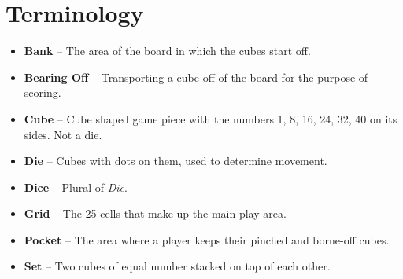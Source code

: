 \section{Terminology}
\begin{itemize}
    \item \textbf{Bank} -- The area of the board in which the cubes start off.
    \item \textbf{Bearing Off} -- Transporting a cube off of the board for the purpose of scoring.
    \item \textbf{Cube} -- Cube shaped game piece with the numbers 1, 8, 16, 24, 32, 40 on its sides. Not a die.
    \item \textbf{Die} -- Cubes with dots on them, used to determine movement.
    \item \textbf{Dice} -- Plural of \textit{Die}.
    \item \textbf{Grid} -- The 25 cells that make up the main play area.
    \item \textbf{Pocket} -- The area where a player keeps their pinched and borne-off cubes.
    \item \textbf{Set} -- Two cubes of equal number stacked on top of each other.
\end{itemize}